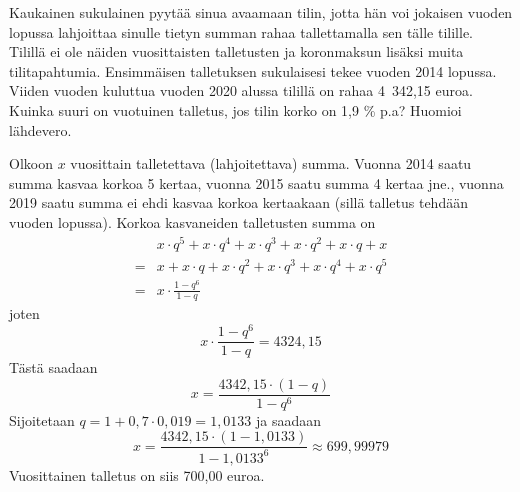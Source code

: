 \documentclass[a4paper,10pt]{article}\usepackage[]{graphicx}\usepackage[]{color}
\begin{document}
\begin{question} 
    Kaukainen sukulainen pyytää sinua avaamaan tilin, jotta hän voi jokaisen vuoden lopussa lahjoittaa sinulle tietyn
summan rahaa tallettamalla sen tälle tilille. Tilillä ei ole näiden vuosittaisten talletusten ja koronmaksun lisäksi muita tilitapahtumia.
Ensimmäisen talletuksen sukulaisesi tekee vuoden 2014 lopussa. Viiden vuoden kuluttua vuoden 2020 alussa tilillä on rahaa 4~342{,}15 euroa.
Kuinka suuri on vuotuinen talletus, jos tilin korko on 1{,}9 \% p.a? Huomioi lähdevero.
\end{question}
\begin{solution}
    Olkoon \(x\) vuosittain talletettava (lahjoitettava) summa. Vuonna 2014 saatu summa kasvaa korkoa 5 kertaa,
    vuonna 2015 saatu summa 4 kertaa jne., vuonna 2019 saatu summa ei ehdi kasvaa korkoa kertaakaan
    (sillä talletus tehdään vuoden lopussa). Korkoa kasvaneiden talletusten summa on
    \begin{align*}
        &x\cdot q^5 + x\cdot q^4+ x\cdot q^3 + x\cdot q^2+ x\cdot q + x \\
        =& x + x\cdot q+ x\cdot q^2 + x\cdot q^3+ x\cdot q^4 + x\cdot q^5\\
        =& x\cdot\frac{1-q^6}{1-q}
    \end{align*}
    joten
    \[
       x\cdot\frac{1-q^6}{1-q} = 4324,15
    \]
    Tästä saadaan
    \[
        x = \frac{4342,15\cdot(1-q)}{1-q^6}
    \]
    Sijoitetaan \(q= 1 + 0,7\cdot0,019=1,0133\) ja saadaan
    \[
    x = \frac{4342,15\cdot(1-1,0133)}{1-1,0133^6} \approx 699,99979
    \]
    Vuosittainen talletus on siis 700,00 euroa.
\end{solution}
\end{document}

